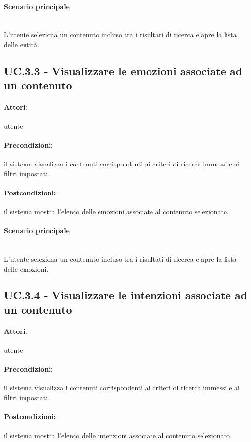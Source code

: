 \documentclass[10pt,a4paper,headinclude,footinclude,hidelinks]{scrreprt} %
\begin{document}
	\paragraph{Scenario principale} \hfill \\
	L'utente seleziona un contenuto incluso tra i risultati di ricerca e apre la lista delle entità.

	\subsection[UC.3.3]{UC.3.3 - Visualizzare le emozioni associate ad un contenuto}
	\label{sec:stage:ar:uc:3_3}
	\paragraph{Attori:} utente
	\paragraph{Precondizioni:} il sistema visualizza i contenuti corrispondenti ai criteri di ricerca immessi e ai filtri impostati.
	\paragraph{Postcondizioni:} il sistema mostra l'elenco delle emozioni associate al contenuto selezionato.
	\paragraph{Scenario principale} \hfill \\
	L'utente seleziona un contenuto incluso tra i risultati di ricerca e apre la lista delle emozioni.

	\subsection[UC.3.4]{UC.3.4 - Visualizzare le intenzioni associate ad un contenuto}
	\label{sec:stage:ar:uc:3_4}
	\paragraph{Attori:} utente
	\paragraph{Precondizioni:} il sistema visualizza i contenuti corrispondenti ai criteri di ricerca immessi e ai filtri impostati.
	\paragraph{Postcondizioni:} il sistema mostra l'elenco delle intenzioni associate al contenuto selezionato.
\end{document}
